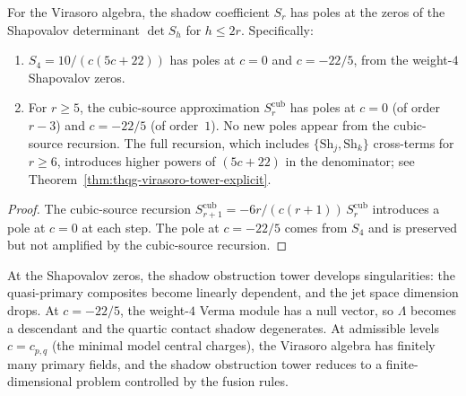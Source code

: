 \begin{proposition}
For the Virasoro algebra, the shadow coefficient $S_r$
has poles at the zeros of the Shapovalov determinant
$\det S_h$ for $h \leq 2r$. Specifically:
\begin{enumerate}[label=\textup{(\roman*)}]
\item $S_4 = 10/(c(5c+22))$ has poles at $c = 0$ and
 $c = -22/5$, from the weight-$4$ Shapovalov zeros.
\item For $r \geq 5$, the cubic-source approximation
 $S_r^{\mathrm{cub}}$ has poles at $c = 0$
 (of order $r - 3$) and $c = -22/5$ (of order~$1$).
 No new poles appear from the cubic-source recursion.
 The full recursion, which includes
 $\{\mathrm{Sh}_j, \mathrm{Sh}_k\}$ cross-terms
 for $r \geq 6$, introduces higher powers of
 $(5c+22)$ in the denominator; see
 Theorem~\textup{\ref{thm:thqg-virasoro-tower-explicit}}.
\end{enumerate}
\end{proposition}

\begin{proof}
The cubic-source recursion
$S_{r+1}^{\mathrm{cub}} = -6r/(c(r+1))\,S_r^{\mathrm{cub}}$
introduces a pole at $c = 0$ at each step. The pole at
$c = -22/5$ comes from $S_4$ and is preserved but not
amplified by the cubic-source recursion.
\end{proof}

\begin{remark}
At the Shapovalov zeros, the shadow obstruction tower develops
singularities: the quasi-primary composites become
linearly dependent, and the jet space dimension drops.
At $c = -22/5$, the weight-$4$ Verma module has a null
vector, so $\Lambda$ becomes a descendant and the quartic
contact shadow degenerates. At admissible levels
$c = c_{p,q}$ (the minimal model central charges), the
Virasoro algebra has finitely many primary fields, and
the shadow obstruction tower reduces to a finite-dimensional problem
controlled by the fusion rules.
\end{remark}

